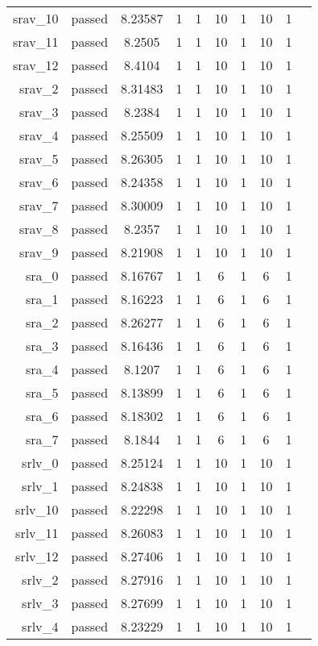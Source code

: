 \begin{longtable}{r|ccccccccc}
    srav\_10 & passed & 8.23587 & 1 & 1 & 10 & 1 & 10 & 1 \\
    srav\_11 & passed & 8.2505 & 1 & 1 & 10 & 1 & 10 & 1 \\
    srav\_12 & passed & 8.4104 & 1 & 1 & 10 & 1 & 10 & 1 \\
    srav\_2 & passed & 8.31483 & 1 & 1 & 10 & 1 & 10 & 1 \\
    srav\_3 & passed & 8.2384 & 1 & 1 & 10 & 1 & 10 & 1 \\
    srav\_4 & passed & 8.25509 & 1 & 1 & 10 & 1 & 10 & 1 \\
    srav\_5 & passed & 8.26305 & 1 & 1 & 10 & 1 & 10 & 1 \\
    srav\_6 & passed & 8.24358 & 1 & 1 & 10 & 1 & 10 & 1 \\
    srav\_7 & passed & 8.30009 & 1 & 1 & 10 & 1 & 10 & 1 \\
    srav\_8 & passed & 8.2357 & 1 & 1 & 10 & 1 & 10 & 1 \\
    srav\_9 & passed & 8.21908 & 1 & 1 & 10 & 1 & 10 & 1 \\
    sra\_0 & passed & 8.16767 & 1 & 1 & 6 & 1 & 6 & 1 \\
    sra\_1 & passed & 8.16223 & 1 & 1 & 6 & 1 & 6 & 1 \\
    sra\_2 & passed & 8.26277 & 1 & 1 & 6 & 1 & 6 & 1 \\
    sra\_3 & passed & 8.16436 & 1 & 1 & 6 & 1 & 6 & 1 \\
    sra\_4 & passed & 8.1207 & 1 & 1 & 6 & 1 & 6 & 1 \\
    sra\_5 & passed & 8.13899 & 1 & 1 & 6 & 1 & 6 & 1 \\
    sra\_6 & passed & 8.18302 & 1 & 1 & 6 & 1 & 6 & 1 \\
    sra\_7 & passed & 8.1844 & 1 & 1 & 6 & 1 & 6 & 1 \\
    srlv\_0 & passed & 8.25124 & 1 & 1 & 10 & 1 & 10 & 1 \\
    srlv\_1 & passed & 8.24838 & 1 & 1 & 10 & 1 & 10 & 1 \\
    srlv\_10 & passed & 8.22298 & 1 & 1 & 10 & 1 & 10 & 1 \\
    srlv\_11 & passed & 8.26083 & 1 & 1 & 10 & 1 & 10 & 1 \\
    srlv\_12 & passed & 8.27406 & 1 & 1 & 10 & 1 & 10 & 1 \\
    srlv\_2 & passed & 8.27916 & 1 & 1 & 10 & 1 & 10 & 1 \\
    srlv\_3 & passed & 8.27699 & 1 & 1 & 10 & 1 & 10 & 1 \\
    srlv\_4 & passed & 8.23229 & 1 & 1 & 10 & 1 & 10 & 1 \\

\end{longtable}
